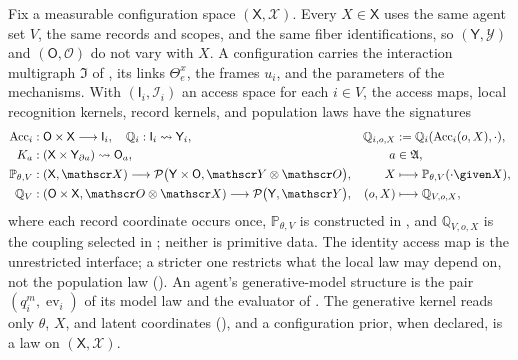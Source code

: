Fix a measurable configuration space $(\mathsf X,\mathscr X)$. Every $X\in\mathsf X$ uses the same agent
set $V$, the same records and scopes, and the same fiber identifications, so $(\mathsf Y,\mathscr Y)$ and
$(\mathsf O,\mathscr O)$ do not vary with $X$. A configuration carries the interaction multigraph
$\mathfrak I$ of , its links $\Theta_e^x$, the frames $u_i$, and the parameters
of the mechanisms. With $(\mathsf I_i,\mathscr I_i)$ an access space for each $i\in V$, the access maps,
local recognition kernels, record kernels, and population laws have the signatures
\begin{align}
\operatorname{Acc}_i&:\mathsf O\times\mathsf X\longrightarrow\mathsf I_i,
\quad\mathbb Q_i:\mathsf I_i\rightsquigarrow\mathsf Y_i,
&\mathbb Q_{i,o,X}&:=\mathbb Q_i(\operatorname{Acc}_i(o,X),\cdot),
\label{eq:prob-local-recognition-kernel}\\
K_a&:(\mathsf X\times\mathsf Y_{\partial a})\rightsquigarrow\mathsf O_a,
&a&\in\mathfrak A,
\label{eq:prob-record-kernel-signature}\\
\mathbb P_{\theta,V}&:(\mathsf X,\mathscr X)\longrightarrow\mathcal P\bigl(\mathsf Y\times\mathsf O,\mathscr Y\otimes\mathscr O\bigr),
&X&\longmapsto\mathbb P_{\theta,V}(\cdot\given X),
\label{eq:prob-generative-signature}\\
\mathbb Q_V&:(\mathsf O\times\mathsf X,\mathscr O\otimes\mathscr X)\longrightarrow\mathcal P\bigl(\mathsf Y,\mathscr Y\bigr),
&(o,X)&\longmapsto\mathbb Q_{V,o,X},
\label{eq:prob-recognition-signature}
\end{align}
where each record coordinate occurs once, $\mathbb P_{\theta,V}$ is constructed in , and
$\mathbb Q_{V,o,X}$ is the coupling selected in ; neither is primitive data. The
identity access map is the unrestricted interface; a stricter one restricts what the local law may depend
on, not the population law (). An agent's generative-model structure is
the pair $(q_i^m,\operatorname{ev}_i)$ of its model law and the evaluator of .
The generative kernel reads only $\theta$, $X$, and latent coordinates (),
and a configuration prior, when declared, is a law on $(\mathsf X,\mathscr X)$.

